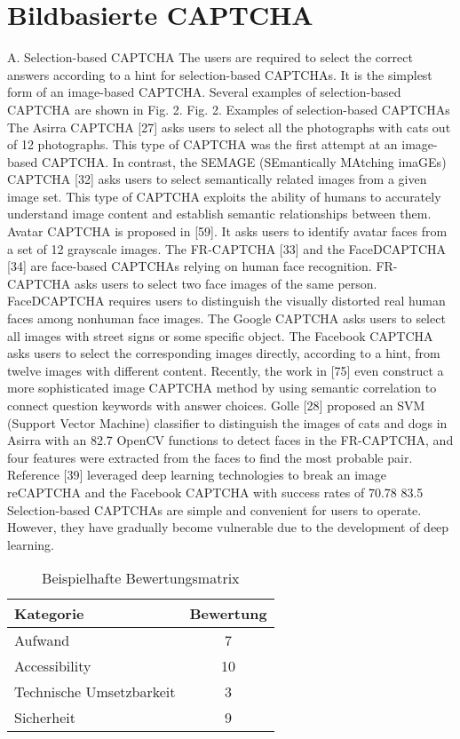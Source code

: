 \section{Bildbasierte CAPTCHA}


A. Selection-based CAPTCHA
The users are required to select the correct answers
according to a hint for selection-based CAPTCHAs. It is the
simplest form of an image-based CAPTCHA. Several
examples of selection-based CAPTCHA are shown in Fig. 2.
Fig. 2. Examples of selection-based CAPTCHAs
The Asirra CAPTCHA [27] asks users to select all the
photographs with cats out of 12 photographs. This type of
CAPTCHA was the first attempt at an image-based
CAPTCHA. In contrast, the SEMAGE (SEmantically
MAtching imaGEs) CAPTCHA [32] asks users to select
semantically related images from a given image set. This type
of CAPTCHA exploits the ability of humans to accurately
understand image content and establish semantic relationships
between them. Avatar CAPTCHA is proposed in [59]. It asks
users to identify avatar faces from a set of 12 grayscale
images. The FR-CAPTCHA [33] and the FaceDCAPTCHA
[34] are face-based CAPTCHAs relying on human face
recognition. FR-CAPTCHA asks users to select two face
images of the same person. FaceDCAPTCHA requires users
to distinguish the visually distorted real human faces among
nonhuman face images. The Google CAPTCHA asks users to
select all images with street signs or some specific object. The
Facebook CAPTCHA asks users to select the corresponding
images directly, according to a hint, from twelve images with
different content. Recently, the work in [75] even construct a
more sophisticated image CAPTCHA method by using
semantic correlation to connect question keywords with
answer choices.
Golle [28] proposed an SVM (Support Vector Machine)
classifier to distinguish the images of cats and dogs in Asirra
with an 82.7%
OpenCV functions to detect faces in the FR-CAPTCHA, and
four features were extracted from the faces to find the most
probable pair. Reference [39] leveraged deep learning
technologies to break an image reCAPTCHA and the
Facebook CAPTCHA with success rates of 70.78%
83.5%
Selection-based CAPTCHAs are simple and convenient
for users to operate. However, they have gradually become
vulnerable due to the development of deep learning.

\begin{table}[h!]
    \caption{Beispielhafte Bewertungsmatrix}
    \begin{center}
        \begin{tabular}{l|c}
            Kategorie                       & Bewertung \\\hline
            Aufwand                         & 7         \\
            Accessibility                   & 10        \\
            Technische Umsetzbarkeit        & 3         \\
            Sicherheit                      & 9         
        \end{tabular}
    \end{center}
\end{table}


